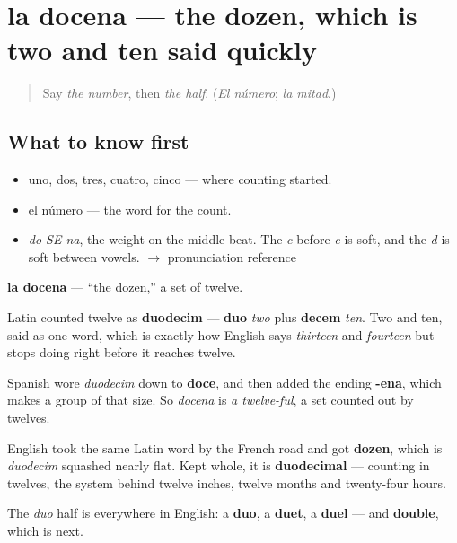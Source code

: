 \section[la docena]{la docena — the dozen, which is two and ten said quickly}

\label{lesson:ES-C344-docena}



\begin{quote}
Say \emph{the number}, then \emph{the half}. (\emph{El número}; \emph{la mitad}.)
\end{quote}

\subsection*{What to know first}
\begin{itemize}
\raggedright
  \item uno, dos, tres, cuatro, cinco — where counting started.
  \item el número — the word for the count.
\end{itemize}

\begin{sounds}
\begin{itemize}
\raggedright
  \item \emph{do-SE-na}, the weight on the middle beat. The \emph{c} before \emph{e} is soft, and the \emph{d} is soft between vowels. $\to$ pronunciation reference
\end{itemize}
\end{sounds}

\begin{cousinweb}
\textbf{la docena} — \textquotedblleft{}the dozen,\textquotedblright{} a set of twelve.

Latin counted twelve as \textbf{duodecim} — \textbf{duo} \emph{two} plus \textbf{decem} \emph{ten}. Two and ten, said as one word, which is exactly how English says \emph{thirteen} and \emph{fourteen} but stops doing right before it reaches twelve.

Spanish wore \emph{duodecim} down to \textbf{doce}, and then added the ending \textbf{-ena}, which makes a group of that size. So \emph{docena} is \emph{a twelve-ful}, a set counted out by twelves.

English took the same Latin word by the French road and got \textbf{dozen}, which is \emph{duodecim} squashed nearly flat. Kept whole, it is \textbf{duodecimal} — counting in twelves, the system behind twelve inches, twelve months and twenty-four hours.

The \emph{duo} half is everywhere in English: a \textbf{duo}, a \textbf{duet}, a \textbf{duel} — and \textbf{double}, which is next.
\end{cousinweb}

